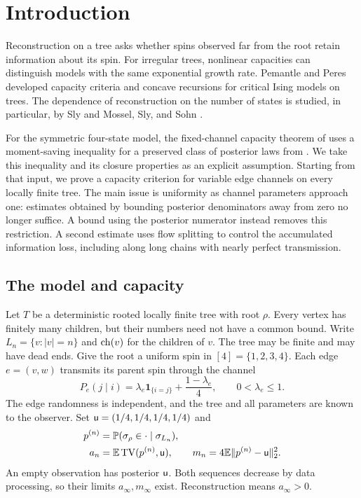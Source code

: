 \section{Introduction}

Reconstruction on a tree asks whether spins observed far from the root
retain information about its spin. For irregular trees, nonlinear
capacities can distinguish models with the same exponential growth rate.
Pemantle and Peres \cite{PP} developed capacity criteria and concave
recursions for critical Ising models on trees. The dependence of
reconstruction on the number of states is studied, in particular, by
Sly \cite{Sly} and Mossel, Sly, and Sohn \cite{MSS}.

For the symmetric four-state model, the fixed-channel capacity theorem
of \cite{Capacity} uses a moment-saving inequality for a preserved class
of posterior laws from \cite{Threshold}. We take this inequality and its
closure properties as an explicit assumption. Starting from that input,
we prove a capacity criterion for variable edge channels on every locally
finite tree. The main issue is uniformity as channel parameters approach
one: estimates obtained by bounding posterior denominators away from
zero no longer suffice. A bound using the posterior numerator instead
removes this restriction. A second estimate uses flow splitting to
control the accumulated information loss, including along long chains
with nearly perfect transmission.

\subsection{The model and capacity}
Let $T$ be a deterministic rooted locally finite tree with root $\rho$.
Every vertex has finitely many children, but their numbers need not have
a common bound. Write $L_n=\{v:|v|=n\}$ and $\operatorname{ch}(v)$ for the children
of $v$. The tree may be finite and may have dead ends. Give the root a
uniform spin in $[4]=\{1,2,3,4\}$. Each edge $e=(v,w)$ transmits its
parent spin through the channel
\begin{equation}\label{eq:channel}
 P_e(j\mid i)=\lambda_e\mathbf 1_{\{i=j\}}+\frac{1-\lambda_e}{4},
 \qquad 0<\lambda_e\leq1.
\end{equation}
The edge randomness is independent, and the tree and all parameters are
known to the observer. Set $\mathsf u=(1/4,1/4,1/4,1/4)$ and
\begin{align}
 p^{(n)}&=\mathbb P(\sigma_\rho\in\cdot\mid\sigma_{L_n}),\notag\\
 a_n&=\mathbb E\operatorname{TV}(p^{(n)},\mathsf u),\qquad
 m_n=4\mathbb E\lVert p^{(n)}-\mathsf u\rVert_2^2.\label{eq:information}
\end{align}
An empty observation has posterior $\mathsf u$. Both sequences decrease by
data processing, so their limits $a_\infty,m_\infty$ exist.
Reconstruction means $a_\infty>0$.

